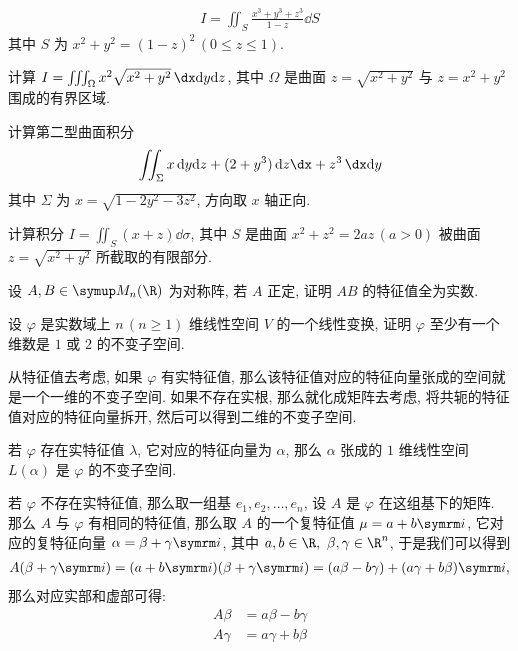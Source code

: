\begin{exercise}[resume=exer]
      \begin{align*}
          I = \iint_{S} \frac{x^{3} + y^{3} + z^{3}}{1-z} \dd{S}
      \end{align*}
      其中 $ S $ 为 $ x^{2} + y^{2} = (1-z)^{2}\,(0 \le z \le 1) $.
      \item 计算 $ I = \iiint_{\Omega} x^{2}\sqrt{x^{2} + y^{2}}\,\dx\dd y\dd z $, 其中 $ \Omega $ 是曲面 $ z = \sqrt{x^{2} + y^{2}} $ 与 $ z = x^{2} + y^{2} $ 围成的有界区域.
      \item 计算第二型曲面积分
      \begin{align*}
          \iint_{\Sigma} x\,\dd y\dd z + (2 + y^{3})\,\dd z\dx + z^{3}\,\dx\dd y
      \end{align*}
      其中 $ \Sigma $ 为 $ x = \sqrt{1 - 2y^{2} - 3z^{2}} $, 方向取 $ x $ 轴正向.
      \item 计算积分 $ I = \iint_{S} (x + z) \dd{\sigma} $, 其中 $ S $ 是曲面 $ x^{2} + z^{2} = 2az\,(a > 0) $ 被曲面 $ z = \sqrt{x^{2} + y^{2}} $ 所截取的有限部分.
      \item 设 $ A, B \in \MM $ 为对称阵, 若 $ A $ 正定, 证明 $ AB $ 的特征值全为实数.
      \item 设 $ \varphi $ 是实数域上 $ n\,(n\ge 1) $ 维线性空间 $ V $ 的一个线性变换, 证明 $ \varphi $ 至少有一个维数是 $ 1 $ 或 $ 2 $ 的不变子空间.
      \begin{hint}
          从特征值去考虑, 如果 $ \varphi $ 有实特征值, 那么该特征值对应的特征向量张成的空间就是一个一维的不变子空间. 如果不存在实根, 那么就化成矩阵去考虑, 将共轭的特征值对应的特征向量拆开, 然后可以得到二维的不变子空间.
      \end{hint}
      \begin{answer}
          若 $ \varphi $ 存在实特征值 $ \lambda $, 它对应的特征向量为 $ \alpha $, 那么 $ \alpha $ 张成的 $ 1 $ 维线性空间 $ L(\alpha) $ 是 $ \varphi $ 的不变子空间.

          若 $ \varphi $ 不存在实特征值, 那么取一组基 $ e_{1}, e_{2}, \dots, e_{n} $, 设 $ A $ 是 $ \varphi $ 在这组基下的矩阵. 那么 $ A $ 与 $ \varphi $ 有相同的特征值, 那么取 $ A $ 的一个复特征值 $ \mu = a + b\mi $, 它对应的复特征向量 $ \alpha = \beta + \gamma\mi $, 其中 $ a, b \in \R,\ \beta, \gamma \in \R^{n} $, 于是我们可以得到
          \begin{align*}
              A(\beta + \gamma\mi) = (a + b\mi)(\beta + \gamma\mi) = (a\beta - b\gamma) + (a\gamma + b\beta)\mi,
          \end{align*}
          那么对应实部和虚部可得:
          \begin{align*}
              A\beta & = a\beta - b\gamma\\
              A\gamma & = a\gamma + b\beta
          \end{align*}


\end{answer}
\end{exercise}
